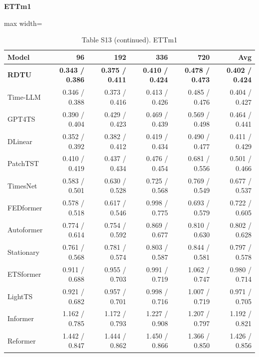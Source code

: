 \begin{table}[H]\centering\small
\caption*{Table S13 (continued). ETTm1}
\textbf{ETTm1}\par\smallskip
\begin{adjustbox}{max width=\linewidth}\begin{tabular}{lrrrrr}\toprule
\textbf{Model} & \textbf{96} & \textbf{192} & \textbf{336} & \textbf{720} & \textbf{Avg}\\\midrule
\rowcolor{blue!5}
\textbf{RDTU} & \textbf{0.343 / 0.386} & \textbf{0.375 / 0.411} & \textbf{0.410 / 0.424} & \textbf{0.478 / 0.473} & \textbf{0.402 / 0.424}\\
Time-LLM & 0.346 / 0.388 & 0.373 / 0.416 & 0.413 / 0.426 & 0.485 / 0.476 & 0.404 / 0.427\\
GPT4TS & 0.390 / 0.404 & 0.429 / 0.423 & 0.469 / 0.439 & 0.569 / 0.498 & 0.464 / 0.441\\
DLinear & 0.352 / 0.392 & 0.382 / 0.412 & 0.419 / 0.434 & 0.490 / 0.477 & 0.411 / 0.429\\
PatchTST & 0.410 / 0.419 & 0.437 / 0.434 & 0.476 / 0.454 & 0.681 / 0.556 & 0.501 / 0.466\\
TimesNet & 0.583 / 0.501 & 0.630 / 0.528 & 0.725 / 0.568 & 0.769 / 0.549 & 0.677 / 0.537\\
FEDformer & 0.578 / 0.518 & 0.617 / 0.546 & 0.998 / 0.775 & 0.693 / 0.579 & 0.722 / 0.605\\
Autoformer & 0.774 / 0.614 & 0.754 / 0.592 & 0.869 / 0.677 & 0.810 / 0.630 & 0.802 / 0.628\\
Stationary & 0.761 / 0.568 & 0.781 / 0.574 & 0.803 / 0.587 & 0.844 / 0.581 & 0.797 / 0.578\\
ETSformer & 0.911 / 0.688 & 0.955 / 0.703 & 0.991 / 0.719 & 1.062 / 0.747 & 0.980 / 0.714\\
LightTS & 0.921 / 0.682 & 0.957 / 0.701 & 0.998 / 0.716 & 1.007 / 0.719 & 0.971 / 0.705\\
Informer & 1.162 / 0.785 & 1.172 / 0.793 & 1.227 / 0.908 & 1.207 / 0.797 & 1.192 / 0.821\\
Reformer & 1.442 / 0.847 & 1.444 / 0.862 & 1.450 / 0.866 & 1.366 / 0.850 & 1.426 / 0.856\\
\bottomrule\end{tabular}\end{adjustbox}\end{table}
